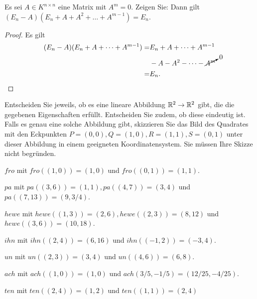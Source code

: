 \begin{Problem}
	Es sei $A\in K^{n\times n}$ eine Matrix mit $A^m=0$. Zeigen Sie: Dann gilt $(E_n-A)(E_n+A+A^2+\dots + A^{m-1})=E_n$.
\end{Problem}

\begin{proof}
	Es gilt
	\begin{align*}
		(E_n-A)(E_n+A+\dots +A^{m-1})=&E_n+A+\dots + A^{m-1}\\
					      &-A - A^2-\dots - \cancelto{0}{A^m}\\
		=& E_n.\qedhere
	\end{align*}
\end{proof}

\begin{Problem}
Entscheiden Sie jeweils, ob es eine lineare Abbildung $\mathbb{R}^2 \to \mathbb{R}^2$ gibt, die die gegebenen Eigenschaften erfüllt. Entscheiden Sie zudem, ob diese eindeutig ist. Falls es genau eine solche Abbildung gibt, skizzieren Sie das Bild des Quadrates mit den Eckpunkten $P=(0,0),Q=(1,0),R=(1,1),S=(0,1)$ unter dieser Abbildung in einem geeigneten Koordinatensystem. Sie müssen Ihre Skizze nicht begründen.   
\begin{parts}
	\item $fro$ mit $fro((1,0))=(1,0)$ und $fro((0,1))=(1,1)$.
	\item $pa$ mit $pa((3,6))=(1,1),pa((4,7))=(3,4)$ und $pa((7,13))=(9, 3 / 4)$.
	\item $hewe$ mit $hewe((1,3))=(2,6),hewe((2,3))=(8,12)$ und $hewe((3,6))=(10,18)$.
	\item $ihn$ mit $ihn((2,4))=(6,16)$ und $ihn((-1,2))=(-3,4)$.
	\item $un$ mit $un((2,3))=(3,4)$ und $un((4,6))=(6,8)$.
	\item $ach$ mit $ach((1,0))=(1,0)$ und $ach(3 / 5, - 1 / 5)=(12 / 25, -4 / 25)$.
	\item $ten$ mit $ten((2,4))=(1,2)$ und $ten((1,1))=(2,4)$
\end{parts}
\end{Problem}
